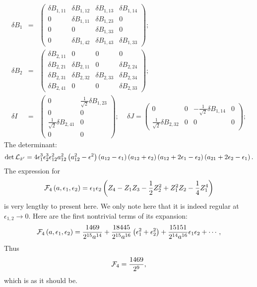 \documentclass[a4paper,12pt]{article}
\begin{document}
\begin{eqnarray}
\delta B_1 &=& \left(\begin{array}{cccc} \delta B_{1,11} & \delta B_{1,12} & \delta B_{1,13} & \delta B_{1,14} \\
0 & \delta B_{1,11} & \delta B_{1,23} & 0 \\
0 & 0 & \delta B_{1,33} & 0
\\ 0 & \delta B_{1,42} & \delta B_{1,43} & \delta B_{1,33}
\end{array}\right); \nonumber \\
\delta B_2 &=& \left(\begin{array}{cccc} \delta B_{2,11} & 0 & 0 & 0 \\ \delta B_{2,21} & \delta B_{2,11} & 0 & \delta B_{2,24} \\
\delta B_{2,31} & \delta B_{2,32} & \delta B_{2,33} & \delta B_{2,34} \\
\delta B_{2,41} & 0 & 0 & \delta B_{2,33}
\end{array}\right); \nonumber \\
\delta I &=& \left(
\begin{array}{cc}
0 & \frac{1}{\sqrt{2}}\delta B_{1,23} \\ 0 & 0 \\ \frac{1}{\sqrt{2}}\delta B_{2,41} & 0 \\ 0 & 0
\end{array}
\right); \, \, \, \, \, \, \,
\delta J= \left(
\begin{array}{cccc}
0 & 0 & -\frac{1}{\sqrt{2}}\delta B_{1,14} & 0 \\ \frac{1}{\sqrt{2}}\delta B_{2,32} & 0 & 0 & 0
\end{array}
\right);
\end{eqnarray}
The determinant:
\begin{eqnarray}
\det {\cal L}_{{\tilde x}'}=4\epsilon_1^3 \epsilon_2^3
\epsilon_{12}^2 a_{12}^2 \left(a_{12}^2-\epsilon^2
\right)\left(a_{12}-\epsilon_1 \right)\left(a_{12}+\epsilon_2
\right)\left(a_{12}+2\epsilon_1-\epsilon_2
\right)\left(a_{21}+2\epsilon_2-\epsilon_1 \right).
\end{eqnarray}
The expression for
\[
{\cal F}_4\left(a, \epsilon_1,\epsilon_2\right)= \epsilon_1 \epsilon_2 \left(Z_4 - Z_1 Z_3 - \frac{1}{2} Z_2^2 +
Z_1^2 Z_2 - \frac{1}{4} Z_1^4\right)
\]
is very lengthy to present here. We only note here that it is
indeed regular at $\epsilon_{1,2}\rightarrow 0$. Here are the
first nontrivial terms of its expansion:
\begin{equation}
{\cal
F}_4\left(a,\epsilon_1,\epsilon_2\right)=\frac{1469}{2^{15}a^{14}}+
\frac{18445}{2^{15}a^{16}}\left(\epsilon_1^2+\epsilon_2^2\right)
+\frac{15151}{2^{14}a^{16}}\epsilon_1 \epsilon_2 +\cdots ,
\end{equation}
Thus
\[
{\cal F}_4=\frac{1469}{2^{9}},
\]
which is as it should be.
\end{document}

